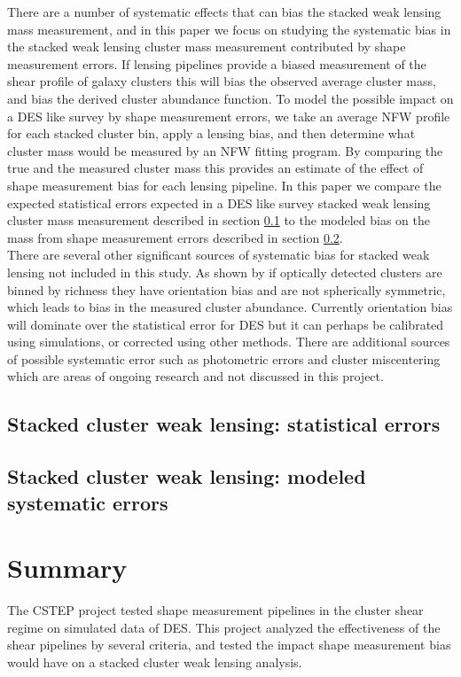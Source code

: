 \documentclass[useAMS,usenatbib]{mn2e}
\begin{document}
\indent There are a number of systematic effects that can bias the
stacked weak lensing mass measurement, and in this paper we focus
on studying the systematic bias in the stacked weak lensing cluster
mass measurement contributed by shape measurement errors. If lensing
pipelines provide a biased measurement of the shear profile of galaxy
clusters this will bias the observed average cluster mass, and bias
the derived cluster abundance function. To model the possible
impact on a DES like survey by shape measurement errors, we take an
average NFW profile for each stacked cluster bin, apply a lensing
bias, and then determine what cluster mass would be measured by
an NFW fitting program. By comparing the true and the measured cluster
mass this provides an estimate of the effect of shape measurement bias
for each lensing pipeline. In this paper we compare the expected statistical errors
expected in a DES like survey stacked weak lensing cluster mass measurement
described in section \ref{sec:p1} to the modeled bias on the mass
from shape measurement errors described in section \ref{sec:p2}. \\
\indent There are several other significant sources of systematic bias for
stacked weak lensing not included in this study. As shown by
\citep{Joerg} if optically detected clusters are binned by richness
they have orientation bias and are not spherically symmetric, which
leads to bias in the measured cluster abundance. Currently
orientation bias will dominate over the statistical error for DES but
it can perhaps be calibrated using simulations, or corrected using
other methods. There are additional sources of possible systematic
error such as photometric errors and cluster miscentering which are 
areas of ongoing research and not discussed in this project.

\subsection{Stacked cluster weak lensing: statistical errors}\label{sec:p1}


\subsection{Stacked cluster weak lensing: modeled systematic errors}\label{sec:p2}


\section{Summary}
The CSTEP project tested shape measurement pipelines in the cluster
shear regime on simulated data of DES. This project
analyzed the effectiveness of the shear pipelines by several criteria,
and tested the impact shape measurement bias would have on a stacked
cluster weak lensing analysis. \\
\end{document}
